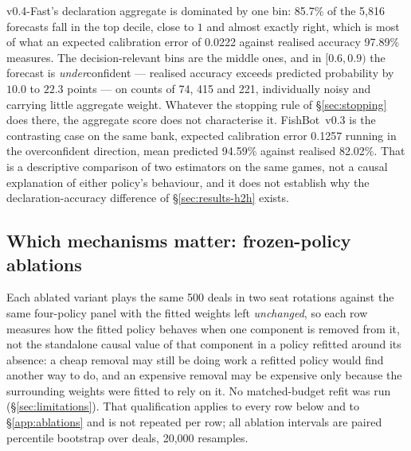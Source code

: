 \documentclass[11pt]{article}
\theoremstyle{definition}
\DeclareRobustCommand{\vfast}{\texorpdfstring{\mbox{v0.4-Fast}}{v0.4-Fast}}
\DeclareRobustCommand{\vthree}{\texorpdfstring{\mbox{FishBot v0.3}}{FishBot v0.3}}
\newcommand{\numAblDeals}{500}
\newcommand{\numDeclECE}{0.0222}
\newcommand{\numDeclObs}{97.89}
\newcommand{\numDeclN}{5{,}816}
\newcommand{\numDeclTopBinShare}{85.7}
\newcommand{\numVthreeDeclECE}{0.1257}
\newcommand{\numVthreeDeclPred}{94.59}
\newcommand{\numVthreeDeclObs}{82.02}
\newcommand{\numBootstrapDraws}{20{,}000}
\begin{document}
\vfast{}'s declaration aggregate is dominated by one bin: \numDeclTopBinShare\% of
the \numDeclN{} forecasts fall in the top decile, close to $1$ and almost exactly
right, which is most of what an expected calibration error of \numDeclECE{}
against realised accuracy \numDeclObs\% measures. The decision-relevant bins are
the middle ones, and in $[0.6, 0.9)$ the forecast is \emph{under}confident ---
realised accuracy exceeds predicted probability by $10.0$ to $22.3$ points --- on counts
of 74, 415 and 221, individually noisy and carrying little aggregate weight.
Whatever the stopping rule of \S\ref{sec:stopping} does there, the aggregate
score does not characterise it. \vthree{} is the contrasting case on the same
bank, expected calibration error \numVthreeDeclECE{} running in the overconfident
direction, mean predicted \numVthreeDeclPred\% against realised
\numVthreeDeclObs\%. That is a descriptive comparison of two estimators on the
same games, not a causal explanation of either policy's behaviour, and it does
not establish why the declaration-accuracy difference of \S\ref{sec:results-h2h}
exists.

\subsection{Which mechanisms matter: frozen-policy ablations}
\label{sec:ablations}

Each ablated variant plays the same \numAblDeals{} deals in two seat rotations
against the same four-policy panel with the fitted weights left \emph{unchanged},
so each row measures how the fitted policy behaves when one component is removed
from it, not the standalone causal value of that component in a policy refitted
around its absence: a cheap removal may still be doing work a refitted policy
would find another way to do, and an expensive removal may be expensive only
because the surrounding weights were fitted to rely on it. No matched-budget
refit was run (\S\ref{sec:limitations}). That qualification applies to every row
below and to \S\ref{app:ablations} and is not repeated per row; all ablation
intervals are paired percentile bootstrap over deals, \numBootstrapDraws{}
resamples.
\end{document}
